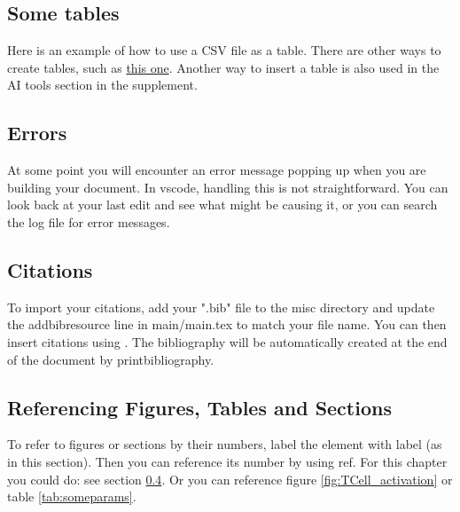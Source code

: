 \subsection{Some tables}
Here is an example of how to use a CSV file as a table. There are other ways to create tables, such as \href{https://www.overleaf.com/learn/latex/Tables}{this one}. Another way to insert a table is also used in the AI tools section in the supplement.

\begin{table}[h]
    \centering
    \caption{Baseline Hyperparameters.}
    \label{tab:someparams}
\end{table}

\subsection{Errors}
At some point you will encounter an error message popping up when you are building your document. In \ac{vscode}, handling this is not straightforward. You can look back at your last edit and see what might be causing it, or you can search the log file for error messages.

\subsection{Citations}
To import your citations, add your ".bib" file to the misc directory and update the addbibresource line in main/main.tex to match your file name.
You can then insert citations using \cite{abramsonAccurateStructurePrediction2024}.
The bibliography will be automatically created at the end of the document by printbibliography.

\subsection{Referencing Figures, Tables and Sections} \label{sec:intro:ref}
To refer to figures or sections by their numbers, label the element with label (as in this section). Then you can reference its number by using ref. For this chapter you could do: see section \ref{sec:intro:ref}. Or you can reference figure \ref{fig:TCell_activation} or table \ref{tab:someparams}.

